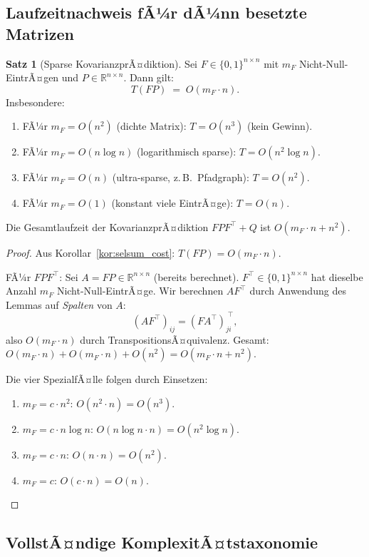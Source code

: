 ﻿\documentclass[a4paper,12pt]{article}
\theoremstyle{definition}
\newtheorem{satz}{Satz}
\begin{document}
\subsection{Laufzeitnachweis fÃ¼r dÃ¼nn besetzte Matrizen}

\begin{satz}[Sparse KovarianzprÃ¤diktion]
\label{satz:sparse}
    Sei $F \in \{0,1\}^{n\times n}$ mit $m_F$ Nicht-Null-EintrÃ¤gen und
    $P \in \mathbb{R}^{n\times n}$. Dann gilt:
    \[
        T(FP) \;=\; O(m_F \cdot n).
    \]
    Insbesondere:
    \begin{enumerate}
        \item FÃ¼r $m_F = O(n^2)$ (dichte Matrix): $T = O(n^3)$ (kein Gewinn).
        \item FÃ¼r $m_F = O(n \log n)$ (logarithmisch sparse): $T = O(n^2 \log n)$.
        \item FÃ¼r $m_F = O(n)$ (ultra-sparse, z.\,B.\ Pfadgraph): $T = O(n^2)$.
        \item FÃ¼r $m_F = O(1)$ (konstant viele EintrÃ¤ge): $T = O(n)$.
    \end{enumerate}
    Die Gesamtlaufzeit der KovarianzprÃ¤diktion $FPF^\top + Q$ ist $O(m_F \cdot n + n^2)$.
\end{satz}

\begin{proof}
Aus Korollar~\ref{kor:selsum_cost}: $T(FP) = O(m_F \cdot n)$.

FÃ¼r $FPF^\top$: Sei $A = FP \in \mathbb{R}^{n\times n}$ (bereits berechnet).
$F^\top \in \{0,1\}^{n\times n}$ hat dieselbe Anzahl $m_F$ Nicht-Null-EintrÃ¤ge.
Wir berechnen $AF^\top$ durch Anwendung des Lemmas auf \emph{Spalten} von $A$:
\[
    (AF^\top)_{ij} = (F A^\top)_{ji}^{\;\top},
\]
also $O(m_F \cdot n)$ durch TranspositionsÃ¤quivalenz.
Gesamt: $O(m_F \cdot n) + O(m_F \cdot n) + O(n^2) = O(m_F \cdot n + n^2)$.

Die vier SpezialfÃ¤lle folgen durch Einsetzen:
\begin{enumerate}
    \item $m_F = c \cdot n^2$: $O(n^2 \cdot n) = O(n^3)$.
    \item $m_F = c \cdot n\log n$: $O(n\log n \cdot n) = O(n^2 \log n)$.
    \item $m_F = c \cdot n$: $O(n \cdot n) = O(n^2)$.
    \item $m_F = c$: $O(c \cdot n) = O(n)$.
\end{enumerate}
\end{proof}

\subsection{VollstÃ¤ndige KomplexitÃ¤tstaxonomie}
\end{document}
